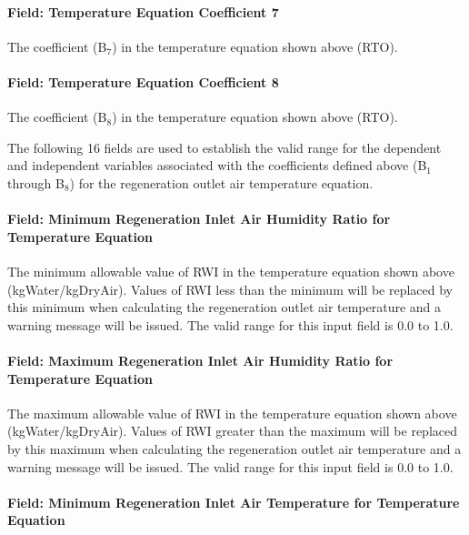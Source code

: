 \paragraph{Field: Temperature Equation Coefficient 7}\label{field-temperature-equation-coefficient-7}

The coefficient (B\(_{7}\)) in the temperature equation shown above (RTO).

\paragraph{Field: Temperature Equation Coefficient 8}\label{field-temperature-equation-coefficient-8}

The coefficient (B\(_{8}\)) in the temperature equation shown above (RTO).

The following 16 fields are used to establish the valid range for the dependent and independent variables associated with the coefficients defined above (B\(_{1}\) through B\(_{8}\)) for the regeneration outlet air temperature equation.

\paragraph{Field: Minimum Regeneration Inlet Air Humidity Ratio for Temperature Equation}\label{field-minimum-regeneration-inlet-air-humidity-ratio-for-temperature-equation}

The minimum allowable value of RWI in the temperature equation shown above (kgWater/kgDryAir). Values of RWI less than the minimum will be replaced by this minimum when calculating the regeneration outlet air temperature and a warning message will be issued. The valid range for this input field is 0.0 to 1.0.

\paragraph{Field: Maximum Regeneration Inlet Air Humidity Ratio for Temperature Equation}\label{field-maximum-regeneration-inlet-air-humidity-ratio-for-temperature-equation}

The maximum allowable value of RWI in the temperature equation shown above (kgWater/kgDryAir). Values of RWI greater than the maximum will be replaced by this maximum when calculating the regeneration outlet air temperature and a warning message will be issued. The valid range for this input field is 0.0 to 1.0.

\paragraph{Field: Minimum Regeneration Inlet Air Temperature for Temperature Equation}\label{field-minimum-regeneration-inlet-air-temperature-for-temperature-equation}

